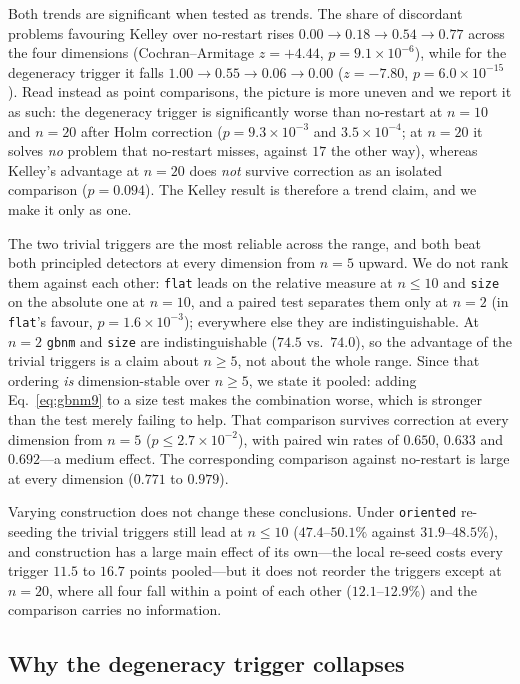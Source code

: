 \documentclass[11pt,a4paper]{article}
\begin{document}
Both trends are significant when tested as trends. The share of
discordant problems favouring Kelley over no-restart rises $0.00 \to 0.18 \to
0.54 \to 0.77$ across the four dimensions (Cochran--Armitage $z=+4.44$,
$p=9.1\times10^{-6}$), while for the degeneracy trigger it falls $1.00 \to 0.55
\to 0.06 \to 0.00$ ($z=-7.80$, $p=6.0\times10^{-15}$). Read instead as point
comparisons, the picture is more uneven and we report it as such: the degeneracy
trigger is significantly worse than no-restart at $n=10$ and $n=20$ after Holm
correction ($p=9.3\times10^{-3}$ and $3.5\times10^{-4}$; at $n=20$ it solves
\emph{no} problem that no-restart misses, against $17$ the other way), whereas
Kelley's advantage at $n=20$ does \emph{not} survive correction as an isolated
comparison ($p=0.094$). The Kelley result is therefore a trend claim, and we make
it only as one.

The two trivial triggers are the most reliable across the range, and both
beat both principled detectors at every dimension from $n=5$ upward. We do not
rank them against each other: \texttt{flat} leads on the relative measure at
$n\le10$ and \texttt{size} on the absolute one at $n=10$, and a paired test
separates them only at $n=2$ (in \texttt{flat}'s favour, $p=1.6\times10^{-3}$);
everywhere else they are indistinguishable. At $n=2$
\texttt{gbnm} and \texttt{size} are indistinguishable ($74.5$ vs.\ $74.0$), so
the advantage of the trivial triggers is a claim about $n\ge5$, not about the
whole range. Since that ordering \emph{is} dimension-stable over $n\ge5$, we
state it pooled: adding Eq.~\eqref{eq:gbnm9} to a size test makes the
combination worse, which is stronger than the test merely failing to help. That
comparison survives correction at every dimension from $n=5$ ($p\le2.7\times
10^{-2}$), with paired win rates of $0.650$, $0.633$ and $0.692$---a medium
effect. The corresponding comparison against no-restart is large at every
dimension ($0.771$ to $0.979$).

Varying construction does not change these conclusions. Under \texttt{oriented}
re-seeding the trivial triggers still lead at $n\le10$ ($47.4$--$50.1\%$ against
$31.9$--$48.5\%$), and construction has a large main effect of its own---the
local re-seed costs every trigger $11.5$ to $16.7$ points pooled---but it does
not reorder the triggers except at $n=20$, where all four fall within a point of
each other ($12.1$--$12.9\%$) and the comparison carries no information.

\subsection{Why the degeneracy trigger collapses}
\label{sec:degeneracy}
\end{document}
